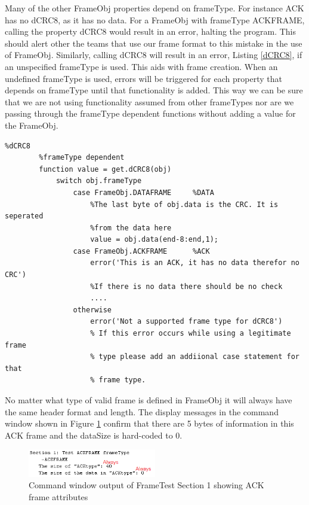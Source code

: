 Many of the other FrameObj properties depend on frameType. For instance ACK has no dCRC8, as it has no data. For a FrameObj with frameType ACKFRAME, calling the property dCRC8 would result in an error, halting the program. This should alert other the teams that use our frame format to this mistake in the use of FrameObj. Similarly, calling dCRC8 will result in an error, Listing \ref{dCRC8}, if an unspecified frameType is used. This aids with frame creation. When an undefined frameType is used, errors will be triggered for each property that depends on frameType until that functionality is added. This way we can be sure that we are not using functionality assumed from other frameTypes nor are we passing through the frameType dependent functions without adding a value for the FrameObj. 

\begin{lstlisting} 
%dCRC8
        %frameType dependent
        function value = get.dCRC8(obj)
            switch obj.frameType
                case FrameObj.DATAFRAME     %DATA
                    %The last byte of obj.data is the CRC. It is seperated
                    %from the data here
                    value = obj.data(end-8:end,1);
                case FrameObj.ACKFRAME      %ACK
                    error('This is an ACK, it has no data therefor no CRC')
                    %If there is no data there should be no check
					....
				otherwise
                    error('Not a supported frame type for dCRC8')
                    % If this error occurs while using a legitimate frame
                    % type please add an addiional case statement for that
                    % frame type.
\end{lstlisting}

No matter what type of valid frame is defined in FrameObj it will always have the same header format and length. The display messages in the command window shown in Figure \ref{fig:FrameTest1} confirm that there are 5 bytes of information in this ACK frame and the dataSize is hard-coded to 0. 

\begin{figure}[h]
    \includegraphics[width=0.5\textwidth, left]{FrameTest1.PNG}
    \caption{Command window output of FrameTest Section 1 showing ACK frame attributes }
    \label{fig:FrameTest1}
\end{figure}

